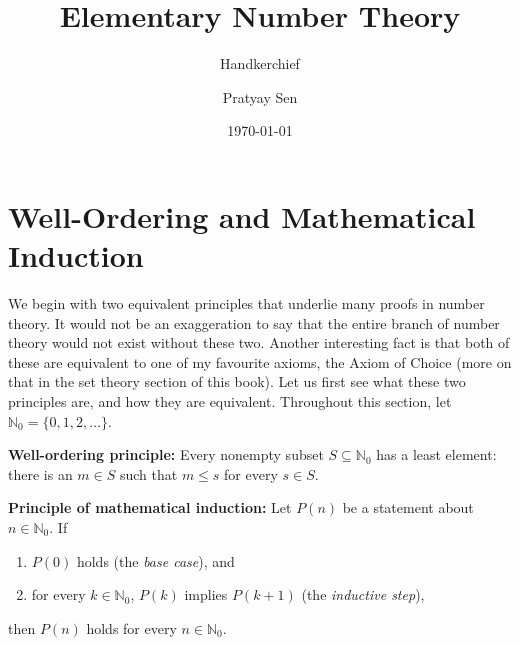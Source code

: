 \documentclass[a4paper,11pt,abstracton]{scrartcl}
\theoremstyle{dotlessP}
\theoremstyle{dotlessS}
\theoremstyle{remark}
\theoremstyle{definition}
\begin{document}

\title{Elementary Number Theory}
\subtitle{Handkerchief}
\author{Pratyay Sen}
\date{\today}
\maketitle

\tableofcontents

\eject



\section{Well-Ordering and Mathematical Induction}

We begin with two equivalent principles that underlie many proofs in
number theory. It would not be an exaggeration to say that the entire branch of number theory would not exist without these two. Another interesting fact is that both of these are equivalent to one of my favourite axioms, the Axiom of Choice (more on that in the set theory section of this book). Let us first see what these two principles are, and how they are equivalent. Throughout this section, let
$\mathbb{N}_0=\{0,1,2,\ldots\}$.

\begin{definition_box}
\textbf{Well-ordering principle:}
Every nonempty subset $S\subseteq\mathbb{N}_0$ has a least element:
there is an $m\in S$ such that $m\leq s$ for every $s\in S$.
\end{definition_box}

\begin{definition_box}
\textbf{Principle of mathematical induction:}
Let $P(n)$ be a statement about $n\in\mathbb{N}_0$. If
\begin{enumerate}
    \item $P(0)$ holds (the \emph{base case}), and
    \item for every $k\in\mathbb{N}_0$, $P(k)$ implies $P(k+1)$
    (the \emph{inductive step}),
\end{enumerate}
then $P(n)$ holds for every $n\in\mathbb{N}_0$.
\end{definition_box}
\end{document}
